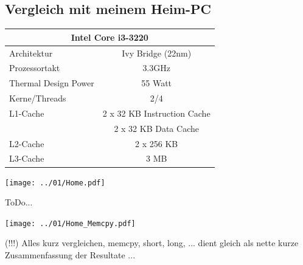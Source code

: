 \documentclass[12pt,a4paper]{article}
\begin{document}
\subsection{Vergleich mit meinem Heim-PC}



\label{sct:home}

\begin{center}
\captionsetup{type=table}
\begin{tabular}{|l|c|}
	\hline
		\multicolumn{2}{|c|}{\textbf{Intel Core i3-3220}} \\
	\hline
	\hline
	Architektur & Ivy Bridge (22nm) \\
	\hline
	Prozessortakt & 3.3GHz \\
	\hline
	Thermal Design Power & 55 Watt \\
	\hline
	Kerne/Threads & 2/4 \\
	\hline
	L1-Cache & 2 x 32 KB Instruction Cache \\
	         & 2 x 32 KB Data Cache \\
	\hline
	L2-Cache & 2 x 256 KB \\
	\hline
	L3-Cache & 3 MB \\
	\hline
\end{tabular}
\end{center}


\begin{center}
	\centering
	\captionsetup{type=figure}
	\begin{minipage}{\linewidth}
		\texttt{[image: ../01/Home.pdf]}
	\end{minipage}
	\label{fig:Home}
\end{center}

ToDo...


\begin{center}
	\centering
	\captionsetup{type=figure}
	\begin{minipage}{\linewidth}
		\texttt{[image: ../01/Home\_Memcpy.pdf]}
	\end{minipage}
	\label{fig:Home_Memcpy}
\end{center}

(!!!) Alles kurz vergleichen, memcpy, short, long, ... dient gleich als nette kurze Zusammenfassung der Resultate ... 

\end{document}
